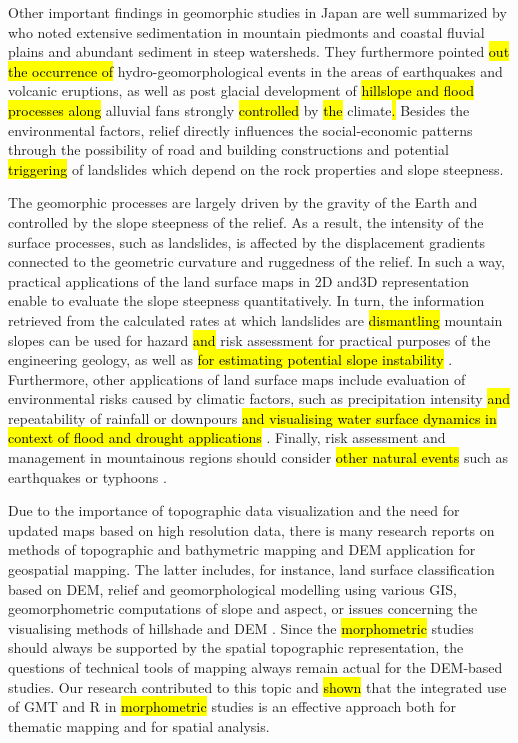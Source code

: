 \documentclass[land,article,submit,pdftex,moreauthors]{Definitions/mdpi}
\begin{document}
Other important findings in geomorphic studies in Japan are well summarized by \cite{OGUCHI20013} who noted extensive sedimentation in mountain piedmonts and coastal fluvial plains and abundant sediment in steep watersheds. They furthermore pointed \hl{out the occurrence of }hydro-geomorphological events in the areas of earthquakes and volcanic eruptions, as well as post glacial development of \hl{hillslope and flood processes along }alluvial fans strongly \hl{controlled} by \hl{the }climate\hl{. }Besides the environmental factors, relief directly influences the social-economic patterns through the possibility of road\hl{ }and building\hl{ }constructions and potential \hl{triggering} of landslides which depend on the rock properties and slope steepness. 

The geomorphic processes are largely driven by the gravity of the Earth and\hl{ }controlled by the slope steepness of the relief. As a result, the intensity of the\hl{ }surface processes, such as landslides, is affected by the displacement gradients connected to the geometric curvature and ruggedness of the relief. In such a way, practical applications of the land surface maps in 2D and3D representation enable to evaluate the slope steepness quantitatively. In turn, the information retrieved from the calculated rates at which landslides are \hl{dismantling }mountain slopes can be used for hazard \hl{and }risk assessment for practical purposes of the engineering geology, as well as \hl{for estimating potential slope instability} \cite{FUJISAWA2010150}. Furthermore, other applications of land surface maps include evaluation of environmental risks caused by climatic factors, such as precipitation intensity\hl{ and }repeatability of rainfall or downpours \cite{Tsunetaka,Oku} \hl{and visualising water surface dynamics in context of flood and drought applications }\cite{rs14102475}. Finally, risk assessment and management in mountainous regions should consider \hl{other natural events} such as earthquakes or typhoons \cite{Yamada,Wangetal2010,HIRATA2019105217}. 

Due to the importance of topographic data visualization and the need for updated maps based on high resolution data, there is many research reports on methods of topographic and bathymetric mapping and DEM application for geospatial mapping. The latter includes, for instance, land surface classification based on DEM, relief and geomorphological modelling using various GIS, geomorphometric computations of slope and aspect, or issues concerning the visualising methods of hillshade and DEM \cite{PRIMA2006373,LIN2004159,HAYAKAWA200690}. Since the \hl{morphometric} studies should always be supported by the spatial topographic representation, the questions of technical tools of mapping always remain actual for the DEM-based studies. Our research contributed to this topic and \hl{shown} that the integrated use of GMT and R in \hl{morphometric} studies is an effective approach both for thematic mapping and for spatial analysis. 
\end{document}
